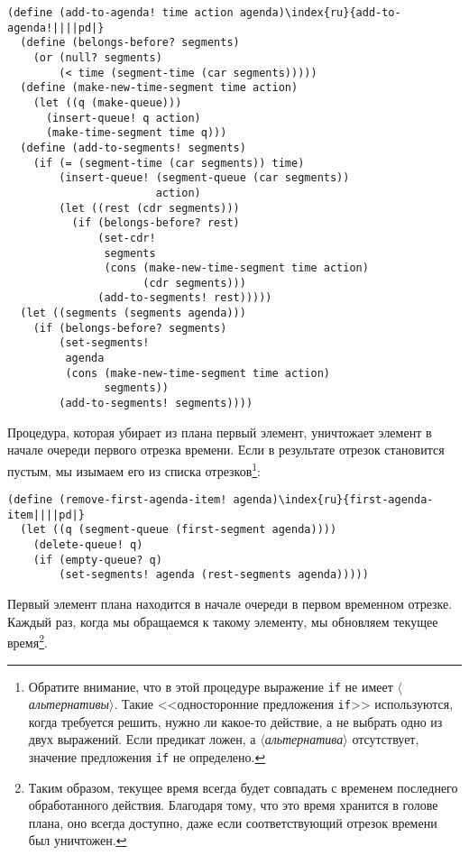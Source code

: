 \begin{Verbatim}[fontsize=\small]
(define (add-to-agenda! time action agenda)\index{ru}{add-to-agenda!||||pd|}
  (define (belongs-before? segments)
    (or (null? segments)
        (< time (segment-time (car segments)))))
  (define (make-new-time-segment time action)
    (let ((q (make-queue)))
      (insert-queue! q action)
      (make-time-segment time q)))
  (define (add-to-segments! segments)
    (if (= (segment-time (car segments)) time)
        (insert-queue! (segment-queue (car segments))
                       action)
        (let ((rest (cdr segments)))
          (if (belongs-before? rest)
              (set-cdr!
               segments
               (cons (make-new-time-segment time action)
                     (cdr segments)))
              (add-to-segments! rest)))))
  (let ((segments (segments agenda)))
    (if (belongs-before? segments)
        (set-segments!
         agenda
         (cons (make-new-time-segment time action)
               segments))
        (add-to-segments! segments))))
\end{Verbatim}

Процедура, которая убирает из плана первый элемент,
уничтожает элемент в начале очереди первого отрезка времени.  Если в
результате отрезок становится пустым, мы изымаем его из списка
отрезков\footnote{Обратите внимание, что в этой процедуре выражение
{\tt if} не имеет \textit{$\langle$альтернативы$\rangle$}.  Такие
<<односторонние предложения {\tt if}>>
используются, когда
требуется решить, нужно ли какое-то действие, а не выбрать одно из
двух выражений. Если предикат ложен, а \textit{$\langle$альтернатива$\rangle$}
отсутствует, значение предложения {\tt if} не определено.
}:

\begin{Verbatim}[fontsize=\small]
(define (remove-first-agenda-item! agenda)\index{ru}{first-agenda-item||||pd|}
  (let ((q (segment-queue (first-segment agenda))))
    (delete-queue! q)
    (if (empty-queue? q)
        (set-segments! agenda (rest-segments agenda)))))
\end{Verbatim}

Первый элемент плана находится в начале очереди в первом
временном отрезке. Каждый раз, когда мы обращаемся к такому элементу,
мы обновляем текущее время\footnote{Таким образом, текущее время всегда будет совпадать с
временем последнего обработанного действия.  Благодаря тому, что это
время хранится в голове плана, оно всегда доступно, даже если
соответствующий отрезок времени был уничтожен.
}.


